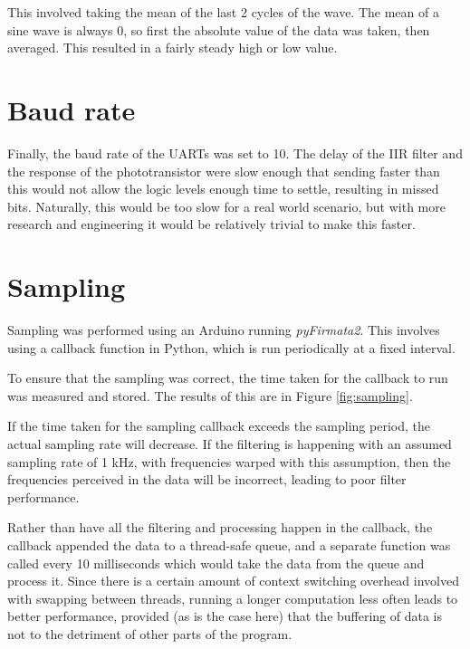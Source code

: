 \documentclass{article}
\begin{document}
\begin{multicols}{2}
This involved taking the mean of the last 2 cycles of the wave. The mean of a sine wave is always 0, so first the absolute value of the data was taken, then averaged. This resulted in a fairly steady high or low value.

\section{Baud rate}
Finally, the baud rate of the UARTs was set to 10. The delay of the IIR filter and the response of the phototransistor were slow enough that sending faster than this would not allow the logic levels enough time to settle, resulting in missed bits. Naturally, this would be too slow for a real world scenario, but with more research and engineering it would be relatively trivial to make this faster. 

\section{Sampling}
Sampling was performed using an Arduino running \textit{pyFirmata2}. This involves using a callback function in Python, which is run periodically at a fixed interval. 

To ensure that the sampling was correct, the time taken for the callback to run was measured and stored. The results of this are in Figure \ref{fig:sampling}. 

If the time taken for the sampling callback exceeds the sampling period, the actual sampling rate will decrease. If the filtering is happening with an assumed sampling rate of 1 kHz, with frequencies warped with this assumption, then the frequencies perceived in the data will be incorrect, leading to poor filter performance.

Rather than have all the filtering and processing happen in the callback, the callback appended the data to a thread-safe queue, and a separate function was called every 10 milliseconds which would take the data from the queue and process it. Since there is a certain amount of context switching overhead involved with swapping between threads, running a longer computation less often leads to better performance, provided (as is the case here) that the buffering of data is not to the detriment of other parts of the program. 


\end{multicols}
\end{document}
